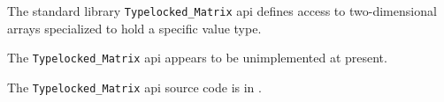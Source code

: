 
The standard library {\tt Typelocked\_Matrix} api defines access to two-dimensional arrays 
specialized to hold a specific value type.

The {\tt Typelocked\_Matrix} api appears to be unimplemented at present.

The {\tt Typelocked\_Matrix} api source code is in .


